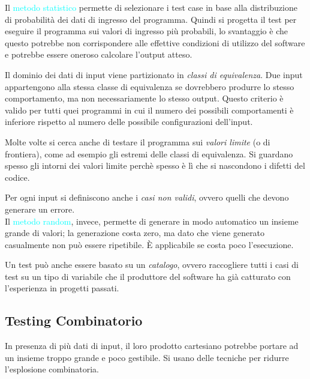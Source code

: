 Il \textcolor{cyan}{metodo statistico} permette di selezionare i test case in base
alla distribuzione di probabilità dei dati di ingresso del programma. Quindi
si progetta il test per eseguire il programma sui valori di ingresso più probabili, lo svantaggio
è che questo potrebbe non corrispondere alle effettive condizioni di utilizzo del software e potrebbe
essere oneroso calcolare l'output atteso.

Il dominio dei dati di input viene partizionato in \emph{classi di equivalenza}. Due input
appartengono alla stessa classe di equivalenza se dovrebbero produrre lo stesso comportamento,
ma non necessariamente lo stesso output. Questo criterio è valido per tutti quei
programmi in cui il numero dei possibili comportamenti è inferiore rispetto al numero
delle possibile configurazioni dell'input.

Molte volte si cerca anche di testare il programma sui \emph{valori limite} (o di frontiera),
come ad esempio gli estremi delle classi di equivalenza. Si guardano spesso gli intorni
dei valori limite perchè spesso è lì che si nascondono i difetti del codice.

Per ogni input si definiscono anche i \emph{casi non validi}, ovvero quelli che devono
generare un errore. \\

Il \textcolor{cyan}{metodo random}, invece, permette di generare in modo automatico un insieme
grande di valori; la generazione costa zero, ma dato che viene generato casualmente non può
essere ripetibile. È applicabile se costa poco l'esecuzione.

Un test può anche essere basato su un \emph{catalogo}, ovvero raccogliere tutti
i casi di test su un tipo di variabile che il produttore del software ha già catturato con l'esperienza in
progetti passati.

\subsection{Testing Combinatorio}

In presenza di più dati di input, il loro prodotto cartesiano potrebbe portare
ad un insieme troppo grande e poco gestibile. Si usano delle tecniche per ridurre
l'esplosione combinatoria.

